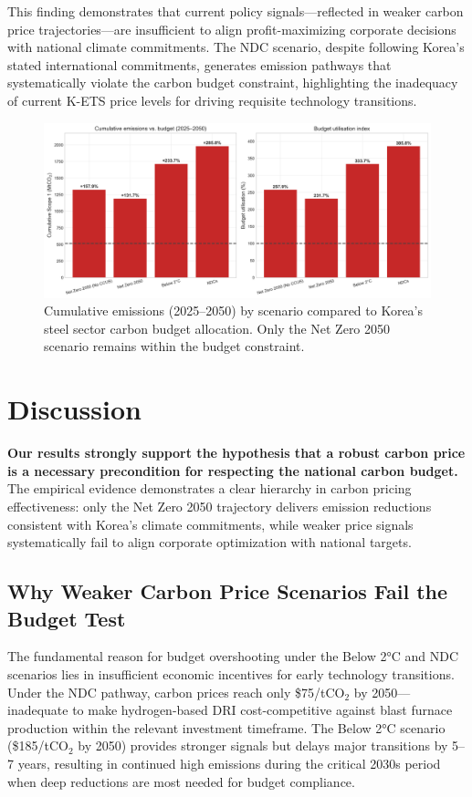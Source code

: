 \documentclass[preprint,5p,authoryear]{elsarticle}
\begin{document}
This finding demonstrates that current policy signals—reflected in weaker carbon price trajectories—are insufficient to align profit-maximizing corporate decisions with national climate commitments. The NDC scenario, despite following Korea's stated international commitments, generates emission pathways that systematically violate the carbon budget constraint, highlighting the inadequacy of current K-ETS price levels for driving requisite technology transitions.

\begin{figure}[!t]
  \centering
  \includegraphics[width=0.85\linewidth]{carbon_budget_compliance}
  \caption{Cumulative emissions (2025--2050) by scenario compared to Korea's steel sector carbon budget allocation. Only the Net Zero 2050 scenario remains within the budget constraint.}
  \label{fig:carbon-budget}
\end{figure}

\section{Discussion}

\textbf{Our results strongly support the hypothesis that a robust carbon price is a necessary precondition for respecting the national carbon budget.} The empirical evidence demonstrates a clear hierarchy in carbon pricing effectiveness: only the Net Zero 2050 trajectory delivers emission reductions consistent with Korea's climate commitments, while weaker price signals systematically fail to align corporate optimization with national targets.

\subsection{Why Weaker Carbon Price Scenarios Fail the Budget Test}

The fundamental reason for budget overshooting under the Below 2°C and NDC scenarios lies in insufficient economic incentives for early technology transitions. Under the NDC pathway, carbon prices reach only \$75/tCO$_2$ by 2050—inadequate to make hydrogen-based DRI cost-competitive against blast furnace production within the relevant investment timeframe. The Below 2°C scenario (\$185/tCO$_2$ by 2050) provides stronger signals but delays major transitions by 5--7 years, resulting in continued high emissions during the critical 2030s period when deep reductions are most needed for budget compliance.
\end{document}
